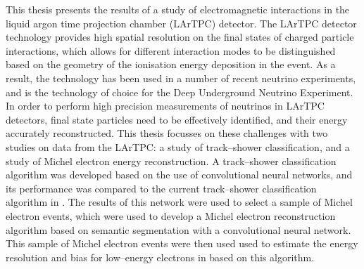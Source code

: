 This thesis presents the results of a study of electromagnetic interactions in 
the \protodune{} liquid argon time projection chamber (LArTPC) detector. The 
LArTPC detector technology provides high spatial resolution on the final states 
of charged particle interactions, which allows for different interaction modes 
to be distinguished based on the geometry of the ionisation energy deposition 
in the event. As a result, the technology has been used in a number of recent 
neutrino experiments, and is the technology of choice for the Deep Underground 
Neutrino Experiment. In order to perform high precision measurements of 
neutrinos in LArTPC detectors, final state particles need to be effectively 
identified, and their energy accurately reconstructed. This thesis focusses on 
these challenges with two studies on data from the \protodune{} LArTPC: a 
study of track--shower classification, and a study of Michel electron energy 
reconstruction. A track--shower classification algorithm was developed based 
on the use of convolutional neural networks, and its performance was compared 
to the current track--shower classification algorithm in \protodune{}. The 
results of this network were used to select a sample of Michel electron 
events, which were used to develop a Michel electron reconstruction algorithm 
based on semantic segmentation with a convolutional neural network. This 
sample of Michel electron events were then used used to estimate the energy 
resolution and bias for low--energy electrons in \protodune{} based on this 
algorithm.
